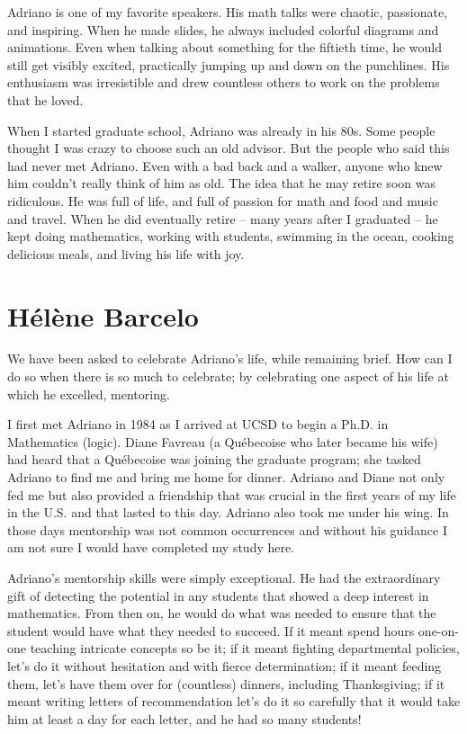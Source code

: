 \documentclass{notices}
\begin{document}
Adriano is one of my favorite speakers. His math talks were chaotic, passionate, and inspiring. When he made slides, he always included colorful diagrams and animations. Even when talking about something for the fiftieth time, he would still get visibly excited, practically jumping up and down on the punchlines. His enthusiasm was irresistible and drew countless others to work on the problems that he loved.

When I started graduate school, Adriano was already in his 80s. Some people thought I was crazy to choose such an old advisor. But the people who said this had never met Adriano. Even with a bad back and a walker, anyone who knew him couldn't really think of him as old. The idea that he may retire soon was ridiculous. He was full of life, and full of passion for math and food and music and travel. When he did eventually retire – many years after I graduated – he kept doing mathematics, working with students, swimming in the ocean, cooking delicious meals, and living his life with joy.

\section*{H\'el\`ene Barcelo}

We have been asked to celebrate Adriano's life, while remaining brief. How can I do so when there is so much to celebrate; by celebrating one aspect of his life at which he excelled, mentoring.

I first met Adriano in 1984 as I arrived at UCSD to begin a Ph.D. in Mathematics (logic). Diane Favreau (a Qu\'ebecoise who later became his wife) had heard that a Qu\'ebecoise was joining the graduate program; she tasked Adriano to find me and bring me home for dinner. Adriano and Diane not only fed me but also provided a friendship that was crucial in the first years of my life in the U.S. and that lasted to this day. Adriano also took me under his wing. In those days mentorship was not common occurrences and without his guidance I am not sure I would have completed my study here.

Adriano's mentorship skills were simply exceptional.  He had the extraordinary gift of detecting the potential in any students that showed a deep interest in mathematics. From then on, he would do what was needed to ensure that the student would have what they needed to succeed. If it meant spend hours one-on-one teaching intricate concepts so be it; if it meant fighting  departmental policies, let's do it without hesitation and with fierce determination; if it meant feeding them, let's have them over for (countless) dinners, including Thanksgiving; if it meant writing letters of recommendation let's do it so carefully that it would take him at least a day for each letter, and he had so many students!
\end{document}
